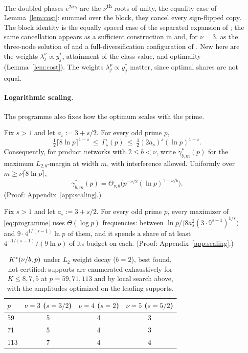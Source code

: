 The doubled phases $e^{2i\alpha_l}$ are the $\nu$\textsuperscript{th} roots of unity, the equality case of Lemma~\ref{lem:cost}: summed over the block, they cancel every sign-flipped copy. The block identity is the equally spaced case of the separated expansion of \citet[Thm.~2]{mohlenkamp2005trig}; the same cancellation appears as a sufficient construction in \citet[Lemma~B.8]{marchetti2026sequential} and, for $\nu=3$, as the three-node solution of \citet{tian2025composing} and a full-diversification configuration of \citet[Sec.~4]{he2026mechanism}. New here are the weights $\lambda_j^\nu\propto y^*_j$, attainment of the class value, and optimality (Lemma~\ref{lem:cost}). The weights $\lambda_j^\nu\propto y^*_j$ matter, since optimal shares are not equal.

\paragraph{Logarithmic scaling.} The programme also fixes how the optimum scales with the prime.

\begin{theorem}\label{thm:scaling}
Fix $s>1$ and let $a_s:=3+s/2$. For every odd prime $p$,
\[
\tfrac12\lceil8\ln p\rceil^{1-s}\ \le\ \Gamma_s(p)\ \le\ \tfrac32(2a_s)^s(\ln p)^{1-s}.
\]
Consequently, for product networks with $2\le b<\nu$, write $\gamma^*_{b,m}(p)$ for the maximum $L_{2,b}$-margin at width $m$, with interference allowed. Uniformly over $m\ge\nu\lceil8\ln p\rceil$,
\[
\gamma^*_{b,m}(p)=\Theta_{\nu,b}\big(p^{-\nu/2}(\ln p)^{1-\nu/b}\big).
\]
(Proof: Appendix~\ref{app:scaling}.)
\end{theorem}

\begin{theorem}\label{thm:count}
Fix $s>1$ and let $a_s:=3+s/2$. For every odd prime $p$, every maximizer of \eqref{eq:programme} uses $\Theta(\log p)$ frequencies: between $\ln p/\big(8a_s^2(3\cdot9^{s-1})^{1/s}\big)$ and $9\cdot4^{1/(s-1)}\ln p$ of them, and it spends a share of at least $4^{-1/(s-1)}/(9\ln p)$ of its budget on each. (Proof: Appendix~\ref{app:scaling}.)
\end{theorem}

\begin{table}[h!]
\centering
\caption{$K^{*}(\nu/b,p)$ under $L_2$ weight decay ($b=2$), best found, not certified: supports are enumerated exhaustively for $K\le8,7,5$ at $p=59,71,113$ and by local search above, with the amplitudes optimized on the leading supports.}
\label{tab:kstar}
\begin{tabular}{lccc}
\toprule
$p$ & $\nu=3$ ($s=3/2$) & $\nu=4$ ($s=2$) & $\nu=5$ ($s=5/2$)\\
\midrule
59 & 5 & 4 & 3\\
71 & 5 & 4 & 3\\
113 & 7 & 4 & 4\\
\bottomrule
\end{tabular}
\end{table}

